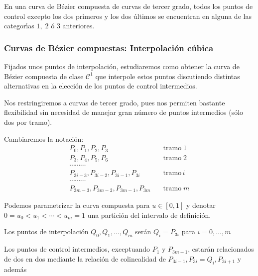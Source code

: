 \documentclass[ebook,oneside]{memoir}
\begin{document}
En una curva de B\'{e}zier compuesta de curvas de tercer grado, todos los puntos de control excepto los dos primeros y los dos \'{u}ltimos se encuentran en alguna de las categor\'{\i}as $1,\;2$ \'{o} $3$ anteriores.

\subsubsection{Curvas de B\'{e}zier compuestas: Interpolaci\'{o}n c\'{u}bica}

Fijados unos puntos de interpolaci\'{o}n, estudiaremos como obtener la curva de B\'{e}zier compuesta de clase ${\mathcal  C}^1$ que interpole estos puntos discutiendo distintas alternativas en la elecci\'{o}n de los puntos de control intermedios.

\vspace{0.2cm}

Nos restringiremos a curvas de tercer grado, pues nos permiten bastante flexibilidad sin necesidad de manejar gran n\'{u}mero de puntos intermedios (s\'{o}lo dos por tramo).

\vspace{0.2cm}

Cambiaremos la notaci\'{o}n:
$$\begin{array}{ll} P_0,P_1,P_2,P_3& \quad \mbox{tramo}\; 1\\P_3,P_4,P_5,P_6&\quad \mbox{tramo}\; 2\\ \cdots \cdots \cdots & \\ P_{3i-3},P_{3i-2},P_{3i-1},P_{3i} & \quad \mbox{tramo}\, i\\  \cdots \cdots \cdots & \\ P_{3m-3},P_{3m-2},P_{3m-1},P_{3m} & \quad \mbox{tramo}\; m \end{array}$$

\vspace{0.2cm}

Podemos parametrizar la curva compuesta para $u\in [0,1]$ y denotar $0=u_0<u_1< \cdots<u_m=1$ una partici\'{o}n del intervalo de definici\'{o}n.

\vspace{0.2cm}

Los puntos de interpolaci\'{o}n $Q_0,Q_1,\ldots,Q_m$ ser\'{a}n $Q_i=P_{3i}$ para $i=0,\ldots,m$

Los puntos de control intermedios, exceptuando $P_1$ y $P_{3m-1}$, estar\'{a}n relacionados de dos en dos mediante la relaci\'{o}n de colinealidad de $P_{3i-1},P_{3i}=Q_i, P_{3i+1}$ y adem\'{a}s
\end{document}
